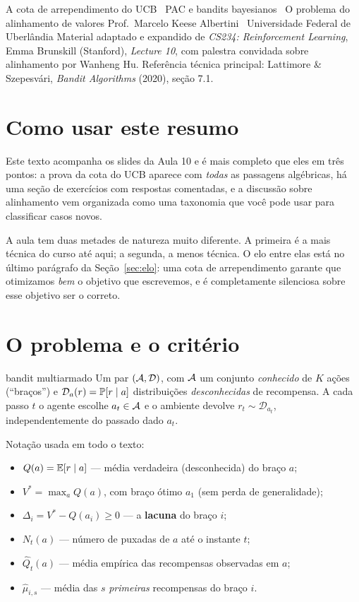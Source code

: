 \documentclass[11pt]{article}
\newcommand{\Qh}{\widehat{Q}}
\newcommand{\muh}{\widehat{\mu}}
\newcommand{\Dist}{\mathcal{D}}
\begin{document}
     {A cota de arrependimento do UCB \textbullet\ PAC e bandits bayesianos
      \textbullet\ O problema do alinhamento de valores}
     {Prof.\ Marcelo Keese Albertini \textbullet\ Universidade Federal de Uberlândia}
     {Material adaptado e expandido de \textit{CS234: Reinforcement Learning},
      Emma Brunskill (Stanford), \textit{Lecture 10}, com palestra convidada
      sobre alinhamento por Wanheng Hu. Referência técnica principal:
      Lattimore \& Szepesvári, \textit{Bandit Algorithms} (2020), seção 7.1.}

\section*{Como usar este resumo}

Este texto acompanha os slides da Aula 10 e é mais completo que eles em três
pontos: a prova da cota do UCB aparece com \emph{todas} as passagens
algébricas, há uma seção de exercícios com respostas comentadas, e a discussão
sobre alinhamento vem organizada como uma taxonomia que você pode usar para
classificar casos novos.

A aula tem duas metades de natureza muito diferente. A primeira é a mais
técnica do curso até aqui; a segunda, a menos técnica. O elo entre elas está no
último parágrafo da Seção~\ref{sec:elo}: uma cota de arrependimento garante que
otimizamos \emph{bem} o objetivo que escrevemos, e é completamente silenciosa
sobre esse objetivo ser o correto.

\section{O problema e o critério}

\begin{defbox}{bandit multiarmado}
Um par $(\gA,\Dist)$, com $\mathcal{A}$ um conjunto \emph{conhecido} de $K$ ações
(``braços'') e $\Dist_a(r) = \Prob[r\mid a]$ distribuições \emph{desconhecidas}
de recompensa. A cada passo $t$ o agente escolhe $a_t\in\mathcal{A}$ e o ambiente
devolve $r_t \sim \Dist_{a_t}$, independentemente do passado dado $a_t$.
\end{defbox}

Notação usada em todo o texto:
\begin{itemize}
  \item $Q(a) = \mathbb{E}[r\mid a]$ --- média verdadeira (desconhecida) do braço $a$;
  \item $V^{*} = \max_a Q(a)$, com braço ótimo $a_1$ (sem perda de generalidade);
  \item $\Delta_i = V^{*} - Q(a_i) \ge 0$ --- a \textbf{lacuna} do braço $i$;
  \item $N_t(a)$ --- número de puxadas de $a$ até o instante $t$;
  \item $\Qh_t(a)$ --- média empírica das recompensas observadas em $a$;
  \item $\muh_{i,s}$ --- média das $s$ \emph{primeiras} recompensas do braço $i$.
\end{itemize}
\end{document}
